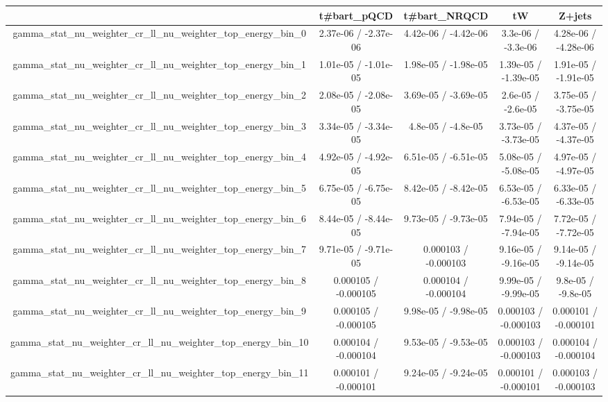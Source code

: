 \documentclass[10pt]{article}
\begin{document}
\begin{table}[htbp]
\begin{center}
\begin{tabular}{|c|c|c|c|c|}
\hline 
      & t#bar{t}_{pQCD}      & t#bar{t}_{NRQCD}      & tW      & Z+jets \\ 
\hline 
  gamma_stat_nu_weighter_cr_ll_nu_weighter_top_energy_bin_0 & 2.37e-06 / -2.37e-06 & 4.42e-06 / -4.42e-06 & 3.3e-06 / -3.3e-06 & 4.28e-06 / -4.28e-06 \\ 
  gamma_stat_nu_weighter_cr_ll_nu_weighter_top_energy_bin_1 & 1.01e-05 / -1.01e-05 & 1.98e-05 / -1.98e-05 & 1.39e-05 / -1.39e-05 & 1.91e-05 / -1.91e-05 \\ 
  gamma_stat_nu_weighter_cr_ll_nu_weighter_top_energy_bin_2 & 2.08e-05 / -2.08e-05 & 3.69e-05 / -3.69e-05 & 2.6e-05 / -2.6e-05 & 3.75e-05 / -3.75e-05 \\ 
  gamma_stat_nu_weighter_cr_ll_nu_weighter_top_energy_bin_3 & 3.34e-05 / -3.34e-05 & 4.8e-05 / -4.8e-05 & 3.73e-05 / -3.73e-05 & 4.37e-05 / -4.37e-05 \\ 
  gamma_stat_nu_weighter_cr_ll_nu_weighter_top_energy_bin_4 & 4.92e-05 / -4.92e-05 & 6.51e-05 / -6.51e-05 & 5.08e-05 / -5.08e-05 & 4.97e-05 / -4.97e-05 \\ 
  gamma_stat_nu_weighter_cr_ll_nu_weighter_top_energy_bin_5 & 6.75e-05 / -6.75e-05 & 8.42e-05 / -8.42e-05 & 6.53e-05 / -6.53e-05 & 6.33e-05 / -6.33e-05 \\ 
  gamma_stat_nu_weighter_cr_ll_nu_weighter_top_energy_bin_6 & 8.44e-05 / -8.44e-05 & 9.73e-05 / -9.73e-05 & 7.94e-05 / -7.94e-05 & 7.72e-05 / -7.72e-05 \\ 
  gamma_stat_nu_weighter_cr_ll_nu_weighter_top_energy_bin_7 & 9.71e-05 / -9.71e-05 & 0.000103 / -0.000103 & 9.16e-05 / -9.16e-05 & 9.14e-05 / -9.14e-05 \\ 
  gamma_stat_nu_weighter_cr_ll_nu_weighter_top_energy_bin_8 & 0.000105 / -0.000105 & 0.000104 / -0.000104 & 9.99e-05 / -9.99e-05 & 9.8e-05 / -9.8e-05 \\ 
  gamma_stat_nu_weighter_cr_ll_nu_weighter_top_energy_bin_9 & 0.000105 / -0.000105 & 9.98e-05 / -9.98e-05 & 0.000103 / -0.000103 & 0.000101 / -0.000101 \\ 
  gamma_stat_nu_weighter_cr_ll_nu_weighter_top_energy_bin_10 & 0.000104 / -0.000104 & 9.53e-05 / -9.53e-05 & 0.000103 / -0.000103 & 0.000104 / -0.000104 \\ 
  gamma_stat_nu_weighter_cr_ll_nu_weighter_top_energy_bin_11 & 0.000101 / -0.000101 & 9.24e-05 / -9.24e-05 & 0.000101 / -0.000101 & 0.000103 / -0.000103 \\ 

\end{tabular}
\end{center}
\end{table}
\end{document}
